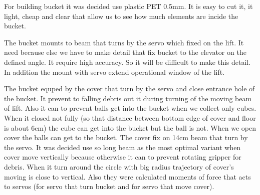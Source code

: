 For building bucket it was decided use plastic PET 0.5mm. It is easy to cut it, it light, cheap and clear that allow us to see how much elements are incide the bucket.\newline  

The bucket mounts to beam that turns by the servo which fixed on the lift. It need because else we have to make detail that fix bucket to the elevator on the defined angle. It require high accuracy. So it will be difficult to make this detail. In addition the mount with servo extend operational window of the lift. \newline

The bucket equped by the cover that turn by the servo and close entrance hole of the bucket. It prevent to falling debris out it during turning of the moving beam of lift. Also it can to prevent balls get into the bucket when we collect only cubes. When it closed not fully (so that distance between bottom edge of cover and floor is about 6cm) the cube can get into the bucket but the ball is not. When we open cover the balls can get to the bucket.\newline
The cover fix on 14cm beam that turn by the servo. It was decided use so long beam as the most optimal variant when cover move vertically because otherwise it can to prevent rotating gripper for debris. When it turn around the circle with big radius trajectory of cover's moving is close to vertical. \newline
Also they were calculated moments of force that acts to servos (for servo that turn bucket and for servo that move cover).



\fillpage
